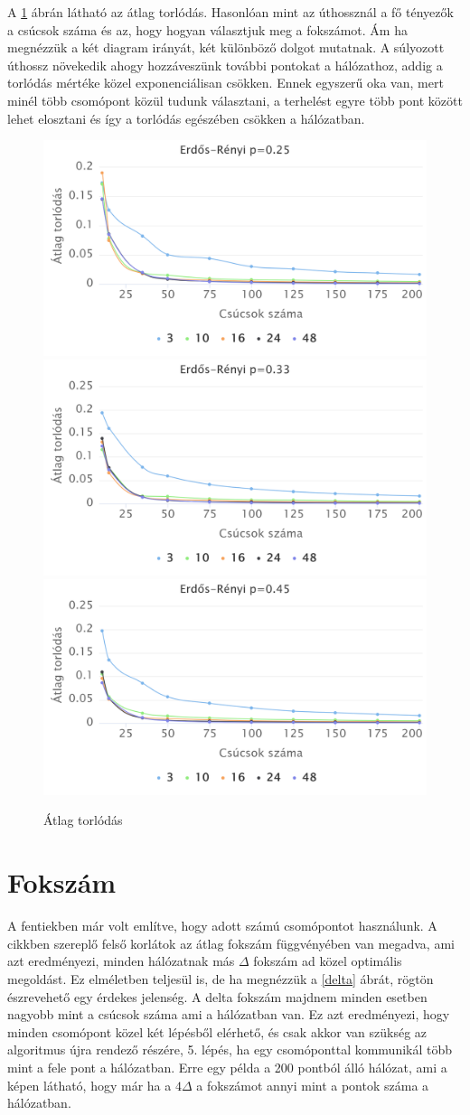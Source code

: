 \documentclass[12pt]{report}
\begin{document}
A \ref{congestion} ábrán látható az átlag torlódás. 
Hasonlóan mint az úthossznál a fő tényezők a csúcsok száma és az, hogy hogyan választjuk meg a fokszámot.
Ám ha megnézzük a két diagram irányát, két különböző dolgot mutatnak. 
A súlyozott úthossz növekedik ahogy hozzáveszünk további pontokat a hálózathoz, addig a torlódás mértéke közel exponenciálisan csökken.
Ennek egyszerű oka van, mert minél több csomópont közül tudunk választani, a terhelést egyre több pont között lehet elosztani és így a torlódás egészében csökken a hálózatban.

\begin{figure}[h]
	\begin{center}
		\includegraphics[width=0.40\linewidth]{pictures/constant_dan_ratio25_congestion.png}
		\includegraphics[width=0.40\linewidth]{pictures/constant_dan_ratio33_congestion.png}
		\includegraphics[width=0.40\linewidth]{pictures/constant_dan_ratio45_congestion.png}
		\caption{Átlag torlódás}
		\label{congestion}
	\end{center}
\end{figure}

\section{Fokszám}

A fentiekben már volt említve, hogy adott számú csomópontot használunk.
A cikkben szereplő felső korlátok az átlag fokszám függvényében van megadva, ami azt eredményezi, minden hálózatnak más $\Delta$ fokszám ad közel optimális megoldást.
Ez elméletben teljesül is, de ha megnézzük a \ref{delta} ábrát, rögtön észrevehető egy érdekes jelenség. 
A delta fokszám majdnem minden esetben nagyobb mint a csúcsok száma ami a hálózatban van.
Ez azt eredményezi, hogy minden csomópont közel két lépésből elérhető, és csak akkor van szükség az algoritmus újra rendező részére, 5. lépés, ha egy csomóponttal kommunikál több mint a fele pont a hálózatban.
Erre egy példa a 200 pontból álló hálózat, ami a képen látható, hogy már ha a $4\Delta$ a fokszámot annyi mint a pontok száma a hálózatban.
\end{document}
